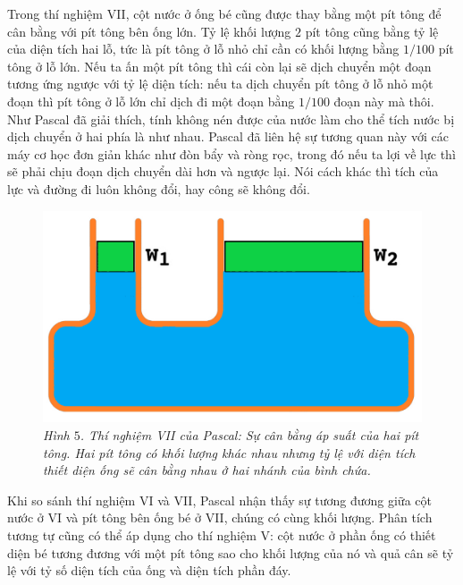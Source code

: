 \begin{multicols}{2}
	\vskip 0.1cm
	\vskip 0.1cm
	Trong thí nghiệm VII, cột nước ở ống bé cũng được thay bằng một pít tông để cân bằng với pít tông bên ống lớn. Tỷ lệ khối lượng $2$ pít tông cũng bằng tỷ lệ của diện tích hai lỗ, tức là pít tông ở lỗ nhỏ chỉ cần có khối lượng bằng $1/100$ pít tông ở lỗ lớn. Nếu ta ấn một pít tông thì cái còn lại sẽ dịch chuyển một đoạn tương ứng ngược với tỷ lệ diện tích: nếu ta dịch chuyển pít tông ở lỗ nhỏ một đoạn thì pít tông ở lỗ lớn chỉ dịch đi một đoạn bằng $1/100$ đoạn này mà thôi. Như Pascal đã giải thích, tính không nén được của nước làm cho thể tích nước bị dịch chuyển ở hai phía là như nhau. Pascal đã liên hệ sự tương quan này với các máy cơ học đơn giản khác như đòn bẩy và ròng rọc, trong đó nếu ta lợi về lực thì sẽ phải chịu đoạn dịch chuyển dài hơn và ngược lại. Nói cách khác thì tích của lực và đường đi luôn không đổi, hay công sẽ không đổi.
	\begin{figure}[H]
		\vspace*{-5pt}
		\centering
		\captionsetup{labelformat= empty, justification=centering}
		\includegraphics[width= 0.8\linewidth]{6}
		\caption{\small\textit{\color{timhieukhoahoc}Hình $5$. Thí nghiệm VII của Pascal: Sự cân bằng áp suất của hai pít tông. Hai pít tông có khối lượng khác nhau nhưng tỷ lệ với diện tích thiết diện ống sẽ cân bằng nhau ở hai nhánh của bình chứa.}}
		\vspace*{-10pt}
	\end{figure}
	\!\!Khi so sánh thí nghiệm VI và VII, Pascal nhận thấy sự tương đương giữa cột nước ở VI và pít tông bên ống bé ở VII, chúng có cùng khối lượng. Phân tích tương tự cũng có thể áp dụng cho thí nghiệm V: cột nước ở phần ống có thiết diện bé tương đương với một pít tông sao cho khối lượng của nó và quả cân sẽ tỷ lệ với tỷ số diện tích của ống và diện tích phần đáy.

\end{multicols}
